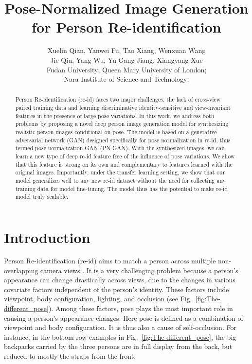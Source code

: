 \documentclass[10pt,letterpaper,twocolumn,10pt,letterpaper,twocolumn]{article}
\begin{document}
\title{Pose-Normalized Image Generation for Person Re-identification}

\author{Xuelin Qian, Yanwei Fu, Tao Xiang,
Wenxuan Wang \\
Jie Qiu, Yang Wu, Yu-Gang Jiang,
Xiangyang Xue\\
Fudan University; Queen Mary University
of London; \\
Nara Institute of Science and Technology; \\
}
\maketitle
\begin{abstract}
Person Re-identification (re-id) faces two major challenges: the lack
of cross-view paired training data and learning discriminative identity-sensitive
and view-invariant features in the presence of large pose variations.
In this work, we address both problems by proposing a novel deep person
image generation model for synthesizing realistic person images conditional
on pose. The model is based on a generative adversarial network (GAN)
designed specifically for pose normalization in re-id, thus termed
pose-normalization GAN (PN-GAN). With the synthesized images, we can
learn a new type of deep re-id feature free of the influence of pose
variations. We show that this feature is strong on its own and complementary
to features learned with the original images. Importantly, under the
transfer learning setting, we show that our model generalizes well to
any new re-id dataset without the need for collecting any training
data for model fine-tuning. The model thus has the potential to make  re-id
model truly scalable. 
\end{abstract}

\section{Introduction}

Person Re-identification (re-id) aims to match a person across multiple
non-overlapping camera views \cite{gong2011person}. It is a very
challenging problem because a person's appearance can change drastically
across views, due to the changes in various covariate factors independent
of the person's identity. These factors include viewpoint, body configuration,
lighting, and occlusion (see Fig.~\ref{fig:The-different_pose}).
Among these factors, pose plays the most important role in causing
a person's appearance changes. Here pose is defined as a combination
of viewpoint and body configuration. It is thus also a cause of self-occlusion.
For instance, in the bottom row examples in Fig.~\ref{fig:The-different_pose},
the big backpacks carried by the three persons are in full display
from the back, but reduced to mostly the straps from the front.
\end{document}
